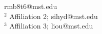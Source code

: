 rmb8t6@mst.edu\\
$^{2}$ \quad Affiliation 2; sihyd@mst.edu\\
$^{3}$ \quad Affiliation 3; liou@mst.edu
